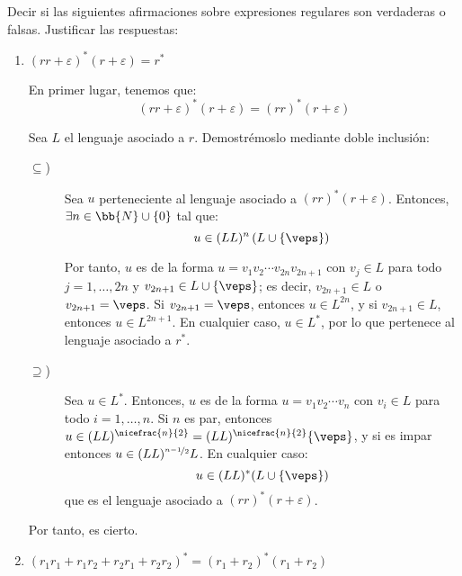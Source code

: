\documentclass[12pt]{article}
\begin{document}
    \begin{ejercicio}[1.25 puntos]
        Decir si las siguientes afirmaciones sobre expresiones regulares son verdaderas o falsas. Justificar las respuestas:
        \begin{enumerate}
            \item $(rr + \varepsilon)^* (r + \varepsilon) = r^*$
            
            En primer lugar, tenemos que:
            \begin{equation*}
                (rr + \varepsilon)^* (r + \varepsilon)
                = (rr)^* (r + \varepsilon)
            \end{equation*}
            
            Sea $L$ el lenguaje asociado a $r$. Demostrémoslo mediante doble inclusión:
            \begin{description}
                \item[$\subseteq$)] Sea $u$ perteneciente al lenguaje asociado a $(rr)^* (r + \varepsilon)$. Entonces, $\exists n\in \bb{N}\cup \{0\}$ tal que:
                \begin{equation*}
                    u\in (LL)^n\left(L\cup \{\veps\}\right)
                \end{equation*}

                Por tanto, $u$ es de la forma $u=v_1v_2\cdots v_{2n}v_{2n+1}$ con $v_j\in L$ para todo $j=1,\ldots,2n$ y $v_{2n+1}\in L\cup \{\veps\}$; es decir, $v_{2n+1}\in L$ o $v_{2n+1}=\veps$. Si $v_{2n+1}=\veps$, entonces $u\in L^{2n}$, y si $v_{2n+1}\in L$, entonces $u\in L^{2n+1}$. En cualquier caso, $u\in L^*$, por lo que pertenece al lenguaje asociado a $r^*$.
                
                \item[$\supseteq$)] Sea $u\in L^*$. Entonces, $u$ es de la forma $u=v_1v_2\cdots v_n$ con $v_i\in L$ para todo $i=1,\ldots,n$. Si $n$ es par, entonces $u\in (LL)^{\nicefrac{n}{2}}=(LL)^{\nicefrac{n}{2}}\{\veps\}$, y si es impar entonces $u\in (LL)^{\nicefrac{n-1}{2}}L$. En cualquier caso:
                \begin{equation*}
                    u\in (LL)^*(L\cup \{\veps\})
                \end{equation*}
                que es el lenguaje asociado a $(rr)^* (r + \varepsilon)$.
            \end{description}

            Por tanto, es cierto.
            \item $(r_1 r_1 + r_1 r_2 + r_2 r_1 + r_2 r_2)^* = (r_1 + r_2)^* (r_1 + r_2)$
            

\end{enumerate}
\end{ejercicio}
\end{document}
